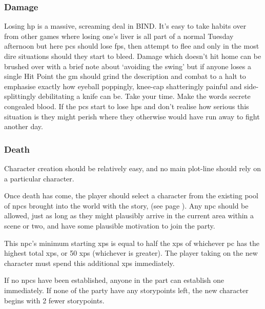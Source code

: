 \begin{multicols}{2}
\subsubsection{Damage}

Losing \gls{hp} is a massive, screaming deal in BIND.
It's easy to take habits over from other games where losing one's liver is all part of a normal Tuesday afternoon but here \glspl{pc} should lose \glspl{fp}, then attempt to flee and only in the most dire situations should they start to bleed.
Damage which doesn't hit home can be brushed over with a brief note about `avoiding the swing' but if anyone loses a single Hit Point the \gls{gm} should grind the description and combat to a halt to emphasise exactly how eyeball poppingly, knee-cap shatteringly painful and side-splittingly debilitating a knife can be.
Take your time.
Make the words secrete congealed blood.
If the \glspl{pc} start to lose \glspl{hp} and don't realise how serious this situation is they might perish where they otherwise would have run away to fight another day.

\subsubsection{Death}
\label{pcdeath}

\iftoggle{aif}{
  Players who want their characters to survive should retire them.
  After all, few of the active Night Guard survive for long.
}{
  Players should see their character's death as normal, and even likely.
}
Character creation should be relatively easy, and no main plot-line should rely on a particular character.

Once death has come, the player should select a character from the existing pool of \glspl{npc} brought into the world with the story,  (see page \pageref{oldnpc}).
Any \gls{npc} should be allowed, just as long as they might plausibly arrive in the current area within a scene or two, and have some plausible motivation to join the party.

This \gls{npc}'s minimum starting \glspl{xp} is equal to half the \glspl{xp} of whichever \gls{pc} has the highest total \glspl{xp}, or 50 \glspl{xp} (whichever is greater).
The player taking on the new character must spend this additional \glspl{xp} immediately.

If no \glspl{npc} have been established, anyone in the part can establish one immediately.
If none of the party have any \glspl{storypoint} left, the new character begins with 2 fewer \glspl{storypoint}.


\end{multicols}

